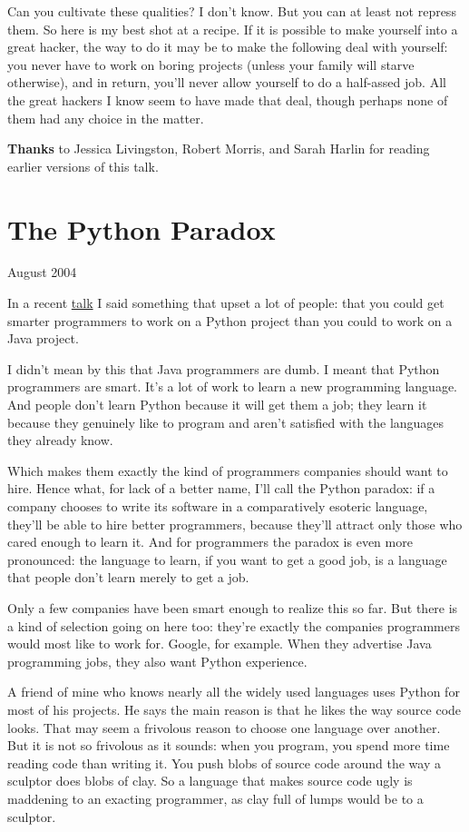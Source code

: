 \documentclass[12pt]{book}
\begin{document}
Can you cultivate these qualities? I don't know. But you can at least
not repress them. So here is my best shot at a recipe. If it is possible
to make yourself into a great hacker, the way to do it may be to make
the following deal with yourself: you never have to work on boring
projects (unless your family will starve otherwise), and in return,
you'll never allow yourself to do a half-assed job. All the great
hackers I know seem to have made that deal, though perhaps none of them
had any choice in the matter.


\textbf{Thanks} to Jessica Livingston, Robert Morris, and Sarah Harlin
for reading earlier versions of this talk.
\chapter{The Python Paradox}

August 2004

In a recent \href{gh.html}{talk} I said something that upset a lot of
people: that you could get smarter programmers to work on a Python
project than you could to work on a Java project.

I didn't mean by this that Java programmers are dumb. I meant that
Python programmers are smart. It's a lot of work to learn a new
programming language. And people don't learn Python because it will get
them a job; they learn it because they genuinely like to program and
aren't satisfied with the languages they already know.

Which makes them exactly the kind of programmers companies should want
to hire. Hence what, for lack of a better name, I'll call the Python
paradox: if a company chooses to write its software in a comparatively
esoteric language, they'll be able to hire better programmers, because
they'll attract only those who cared enough to learn it. And for
programmers the paradox is even more pronounced: the language to learn,
if you want to get a good job, is a language that people don't learn
merely to get a job.

Only a few companies have been smart enough to realize this so far. But
there is a kind of selection going on here too: they're exactly the
companies programmers would most like to work for. Google, for example.
When they advertise Java programming jobs, they also want Python
experience.

A friend of mine who knows nearly all the widely used languages uses
Python for most of his projects. He says the main reason is that he
likes the way source code looks. That may seem a frivolous reason to
choose one language over another. But it is not so frivolous as it
sounds: when you program, you spend more time reading code than writing
it. You push blobs of source code around the way a sculptor does blobs
of clay. So a language that makes source code ugly is maddening to an
exacting programmer, as clay full of lumps would be to a sculptor.
\end{document}
